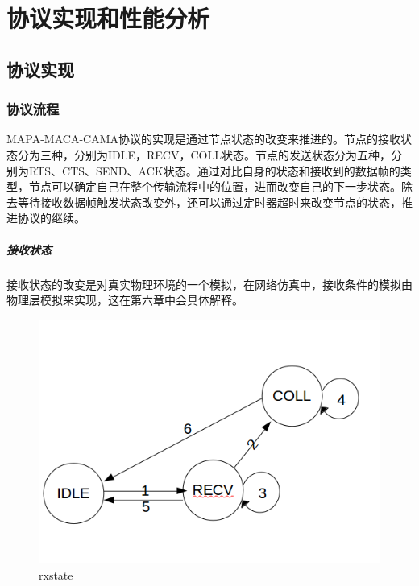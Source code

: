 \chapter{协议实现和性能分析}
\section {协议实现}
\subsection{协议流程}
MAPA-MACA-CAMA协议的实现是通过节点状态的改变来推进的。节点的接收状态分为三种，分别为IDLE，RECV，COLL状态。节点的发送状态分为五种，分别为RTS、CTS、SEND、ACK状态。通过对比自身的状态和接收到的数据帧的类型，节点可以确定自己在整个传输流程中的位置，进而改变自己的下一步状态。除去等待接收数据帧触发状态改变外，还可以通过定时器超时来改变节点的状态，推进协议的继续。
\paragraph{接收状态}
接收状态的改变是对真实物理环境的一个模拟，在网络仿真中，接收条件的模拟由物理层模拟来实现，这在第六章中会具体解释。
 \begin{figure}[!ht]
 	\centering
 	\includegraphics[scale=0.4]{figures/rxstate.png}
 	\caption{
 		rxstate
 	}
 	\label{fig:example}
 \end{figure}
 
